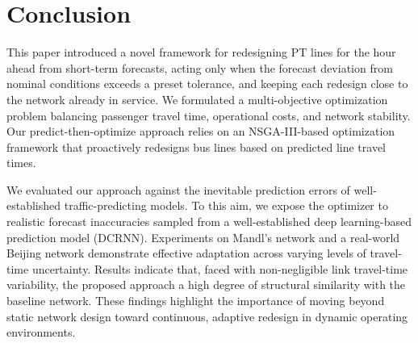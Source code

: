 \documentclass[11pt,a4paper]{article} %
\begin{document}
\section{Conclusion}\label{sec:conclu}
This paper introduced a novel framework for redesigning PT lines for the hour ahead from short-term forecasts, acting only when the forecast deviation from nominal conditions exceeds a preset tolerance, and keeping each redesign close to the network already in service.
We formulated a multi-objective optimization problem balancing passenger travel time, operational costs, and network stability. Our predict-then-optimize approach relies on an NSGA-III-based optimization framework that proactively redesigns bus lines based on predicted line travel times. 

We evaluated our approach against the inevitable prediction errors of well-established traffic-predicting models. To this aim, we expose the optimizer to realistic forecast inaccuracies sampled from a well-established deep learning-based prediction model (DCRNN).
Experiments on Mandl's network and a real-world Beijing network demonstrate effective adaptation across varying levels of travel-time uncertainty. 
%
Results indicate that, faced with non-negligible link travel-time variability, the proposed approach  a high degree of structural similarity with the baseline network.
%
These findings highlight the importance of moving beyond static network design toward continuous, adaptive redesign in dynamic operating environments.
%

\setlength{\bibitemsep}{0pt}
\begingroup\small\printbibliography\endgroup
\end{document}
